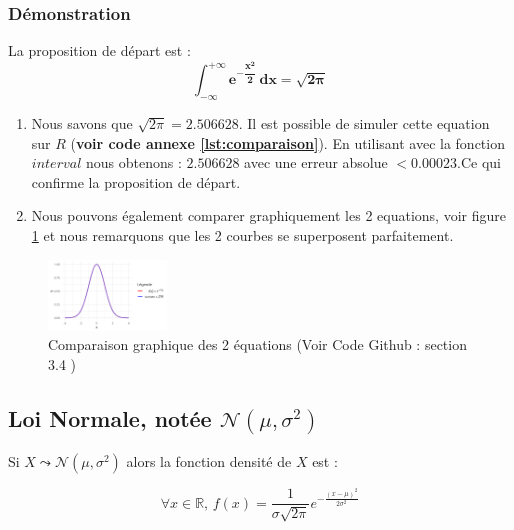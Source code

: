         \subsubsection{Démonstration}
            La proposition de départ est : 
            \begin{equation}
                \mathbf{\int_{-\infty}^{+\infty}e^{-\dfrac{x^2}{2}}\,dx=\sqrt{2\pi}}
            \end{equation}

            \begin{enumerate}
                \item Nous savons que $\sqrt{2\pi} = 2.506628$. Il est possible de simuler cette equation sur $R$ (\textbf{voir code annexe \ref{lst:comparaison}}). En utilisant avec la fonction $interval$ nous obtenons : $2.506628$ avec une erreur absolue $< 0.00023$.Ce qui confirme la proposition de départ.
                \item Nous pouvons également comparer graphiquement les 2 equations, voir figure \ref{fig:egalite} et nous remarquons que les 2 courbes se superposent parfaitement.
            \end{enumerate}
            \begin{figure}[H]
                \centering
                \includegraphics[width=0.28\textwidth]{4_attachments/figures/output11.png}
                \caption{Comparaison graphique des 2 équations (Voir Code Github : section 3.4 \cite{git})}
                \label{fig:egalite}
            \end{figure}


    \subsection{Loi Normale, notée $\mathcal{N}(\mu,\sigma^2)$}
        Si $X\leadsto\mathcal N(\mu,\sigma^2)$ alors la fonction densité de $X$ est :

        \begin{equation}
            \forall x\in\mathbb R,\, f(x)= \dfrac{1}{\sigma\sqrt{2\pi}}e^{-\frac{(x-\mu)^2}{2\sigma^2}}
        \end{equation}

